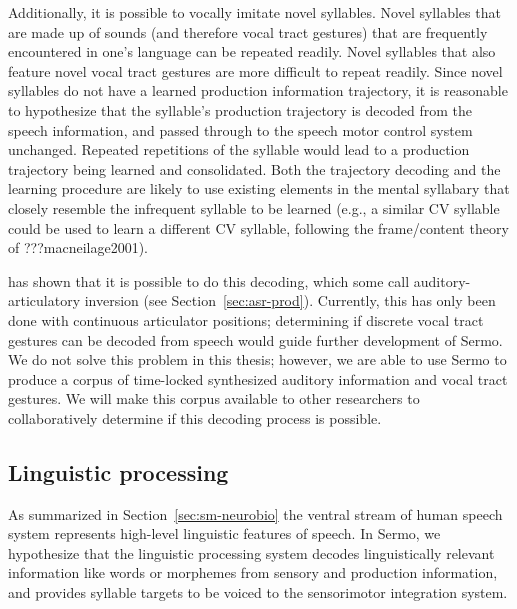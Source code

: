 Additionally,
it is possible to vocally imitate
novel syllables.
Novel syllables that are made up of sounds
(and therefore vocal tract gestures)
that are frequently encountered
in one's language can be
repeated readily.
Novel syllables that also feature
novel vocal tract gestures
are more difficult to repeat readily.
Since novel syllables do not have
a learned production information trajectory,
it is reasonable to hypothesize that
the syllable's production trajectory
is decoded from the speech information,
and passed through to the
speech motor control system unchanged.
Repeated repetitions of the syllable
would lead to a production trajectory
being learned and consolidated.
Both the trajectory decoding and
the learning procedure are likely
to use existing elements
in the mental syllabary
that closely resemble the
infrequent syllable to be learned
(e.g., a similar CV syllable could
be used to learn a different CV syllable,
following the frame/content theory
of ???macneilage2001).

\citet{uria2011} has shown that it is possible to
do this decoding,
which some call auditory-articulatory inversion
(see Section~\ref{sec:asr-prod}).
Currently, this has only been done
with continuous articulator positions;
determining if discrete vocal tract gestures
can be decoded from speech
would guide further development of Sermo.
We do not solve this problem
in this thesis;
however, we are able to use Sermo
to produce a corpus of time-locked
synthesized auditory information
and vocal tract gestures.
We will make this corpus available
to other researchers
to collaboratively determine
if this decoding process is possible.

\subsection{Linguistic processing}

As summarized in Section~\ref{sec:sm-neurobio}
the ventral stream of human speech system
represents high-level linguistic features of speech.
In Sermo, we hypothesize that
the linguistic processing system
decodes linguistically relevant information
like words or morphemes
from sensory and production information,
and provides syllable targets
to be voiced to the sensorimotor integration system.

